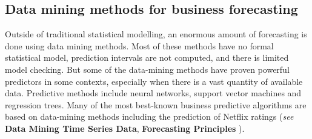 \documentclass[a4paper,10pt]{article}
\begin{document}
\subsection*{Data mining methods for business forecasting}

Outside of traditional statistical modelling, an enormous amount of forecasting is done using data mining methods. Most of these methods have no formal statistical model, prediction intervals are not computed, and there is limited model checking. But some of the data-mining methods have proven powerful predictors in some contexts, especially when there is a vast quantity of available data. Predictive methods include neural networks, support vector machines and regression trees. Many of the most best-known business predictive algorithms are based on data-mining methods including the prediction of Netflix ratings (\textit{see} \textbf{Data Mining Time Series Data}, \textbf{Forecasting Principles}
).




\nocite{fpp3}


\end{document}
